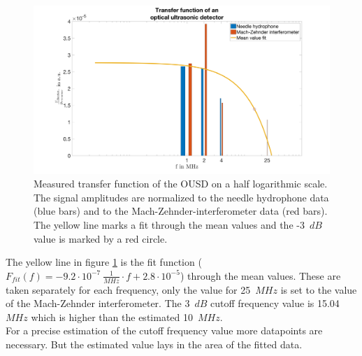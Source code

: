 \begin{figure}[H]			
	\includegraphics[width = \textwidth, height=0.4\textheight]{06_ex-results_of_OUSD/images/transF.png}
	\caption{Measured transfer function of the OUSD on a half logarithmic scale. The signal amplitudes are normalized to the needle hydrophone data (blue bars) and to the Mach-Zehnder-interferometer data (red bars). The yellow line marks a fit through the mean values and the -3~$dB$ value is marked by a red circle.}
	\label{fig:transF}
\end{figure}

The yellow line in figure \ref{fig:transF} is the fit function ($F_{fit}(f) = -9.2\cdot10^{-7}~\frac{1}{MHz} \cdot f + 2.8\cdot10^{-5}$) through the mean values. These are taken separately for each frequency, only the value for 25~$MHz$ is set to the value of the Mach-Zehnder interferometer. The 3~$dB$ cutoff frequency value is 15.04~$MHz$ which is higher than the estimated 10~$MHz$.\\
For a precise estimation of the cutoff frequency value more datapoints are necessary. But the estimated value lays in the area of the fitted data. 
